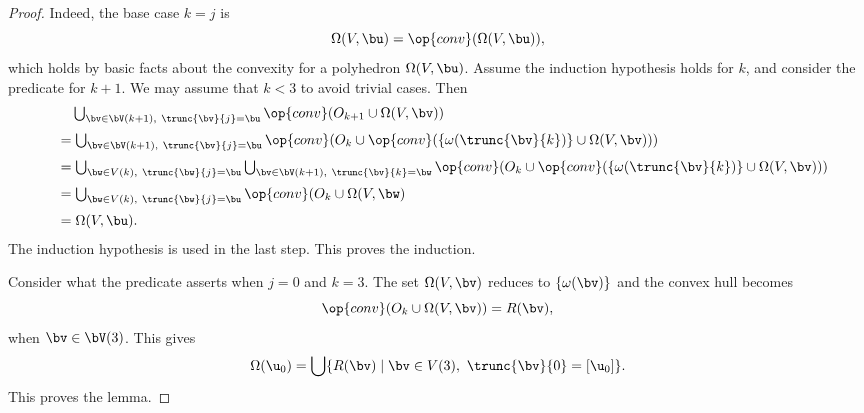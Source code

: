 \begin{proof}
  Indeed, the base case
$k=j$ is 
\begin{displaymath}
\Omega(V,\bu) = \op{conv}(\Omega(V,\bu)),
\end{displaymath}
which holds by basic facts about the convexity for a polyhedron $\Omega(V,\bu)$.
Assume the induction hypothesis holds for $k$, and consider the predicate for
$k+1$.  We may assume that $k<3$ to avoid trivial cases.
Then
\begin{displaymath}
\begin{array}{lll}
&\phantom{=}\bigcup _{\bv \in \bV(k+1),~\trunc{\bv}{j}=\bu}
\op{conv}(O_{k+1} \cup\Omega(V,\bv))
%
\vspace{6pt}\\
&=\bigcup _{\bv \in \bV(k+1),~\trunc{\bv}{j}=\bu}
\op{conv}(O_{k} \cup\op{conv}(\{\omega(\trunc{\bv}{k})\}\cup\Omega(V,\bv)))
\vspace{6pt}\\
&=\bigcup _{\bw\in V(k),~\trunc{\bw}{j}=\bu}
\bigcup_{\bv \in \bV(k+1),~\trunc{\bv}{k}=\bw}
\op{conv}(O_{k} \cup\op{conv}(\{\omega(\trunc{\bv}{k})\}\cup\Omega(V,\bv)))
\vspace{6pt}\\
&=\bigcup _{\bw\in V(k),~\trunc{\bw}{j}=\bu}
\op{conv}(O_{k} \cup \Omega(V,\bw)    
\vspace{6pt}\\
&=\Omega(V,\bu).
\end{array}
\end{displaymath}
The induction hypothesis is used in the last step.  This proves the induction.

Consider  what the predicate asserts when $j=0$ and $k=3$.  The set $\Omega(V,\bv)$
reduces to $\{\omega(\bv)\}$  and the convex hull becomes
\begin{displaymath}
\op{conv}(O_{k}\cup \Omega(V,\bv)) = R(\bv),
\end{displaymath}
when $\bv\in \bV(3)$.
This gives
\begin{equation}
\Omega(\u_0) = \bigcup \{ R(\bv) \mid \bv\in V(3),~\trunc{\bv}{0} =[\u_0]\}.
\end{equation}
This proves the lemma.
\end{proof}


